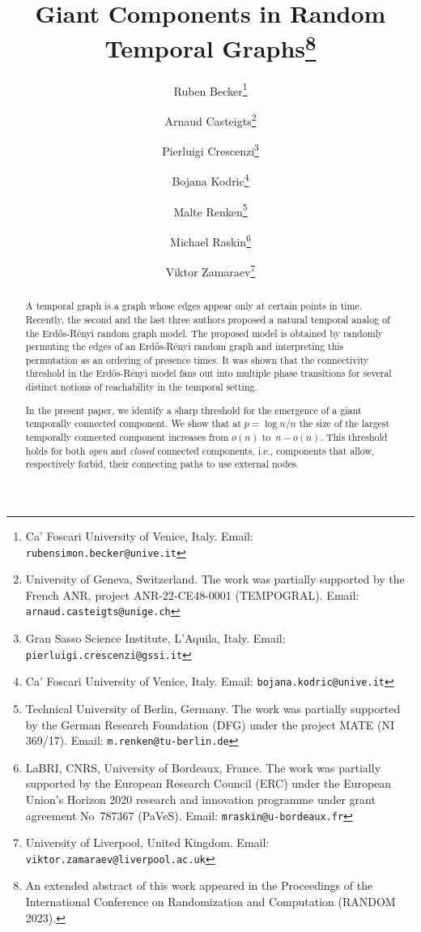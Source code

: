 \documentclass[a4paper,11pt]{article}
\title{Giant Components in Random Temporal Graphs\footnote{An extended abstract of this work appeared in the Proceedings of the International Conference on Randomization and Computation (RANDOM 2023).}}
\author{
        Ruben Becker\thanks{Ca' Foscari University of Venice, Italy. Email: \texttt{rubensimon.becker@unive.it} \orcidlink{0000-0002-3495-3753}}
	\and
        Arnaud Casteigts\thanks{University of Geneva, Switzerland. The work was partially supported by the French ANR, project ANR-22-CE48-0001 (TEMPOGRAL). Email: \texttt{arnaud.casteigts@unige.ch} \orcidlink{0000-0002-7819-7013}}
	\and
        Pierluigi Crescenzi\thanks{Gran Sasso Science Institute, L'Aquila, Italy. Email: \texttt{pierluigi.crescenzi@gssi.it} \orcidlink{0000-0001-8789-3195}}
	\and
        Bojana Kodric\thanks{Ca' Foscari University of Venice, Italy. Email: \texttt{bojana.kodric@unive.it} \orcidlink{0000-0001-7242-0096}}
	\and
        Malte Renken\thanks{Technical University of Berlin, Germany. The work was partially supported by the German Research Foundation (DFG) under the project MATE (NI 369/17). Email: \texttt{m.renken@tu-berlin.de} \orcidlink{0000-0002-1450-1901}}
	\and
        Michael Raskin\thanks{LaBRI, CNRS, University of Bordeaux, France. The work was partially supported by the European Research Council (ERC) under the European Union’s Horizon 2020 research and innovation programme under grant agreement No~787367 (PaVeS). Email: \texttt{mraskin@u-bordeaux.fr} \orcidlink{0000-0002-6660-5673}}
	\and
        Viktor Zamaraev\thanks{University of Liverpool, United Kingdom. Email: \texttt{viktor.zamaraev@liverpool.ac.uk} \orcidlink{0000-0001-5755-4141}}
}
\theoremstyle{definition}
\theoremstyle{plain}
\newcommand{\ie}{i.e.,\xspace}
\newcommand{\Erdos}{Erd\H{o}s}
\newcommand{\Renyi}{R\'enyi}
\newcommand{\ER}{\Erdos-\Renyi}
\begin{document}
\maketitle

\begin{abstract}
	
	A temporal graph is a graph whose edges appear only at certain points in time. 
	Recently, the second and the last three authors proposed a natural temporal analog of the \ER{} random graph model. The proposed model is obtained by randomly permuting the edges of an \ER{} random graph and interpreting this permutation as an ordering of presence times. It was shown that the connectivity threshold in the \ER{} model fans out into multiple phase transitions for several distinct notions of reachability in the temporal setting.
	
	In the present paper, we identify a sharp threshold for the emergence of a giant temporally connected component. We show that at $p = \log n/n$ the size of the largest temporally connected component increases from $o(n)$ to~$n-o(n)$. This threshold holds for both \emph{open} and \emph{closed} connected components, \ie{} components that allow, respectively forbid, their connecting paths to use external nodes.
	

\end{abstract}
\end{document}
